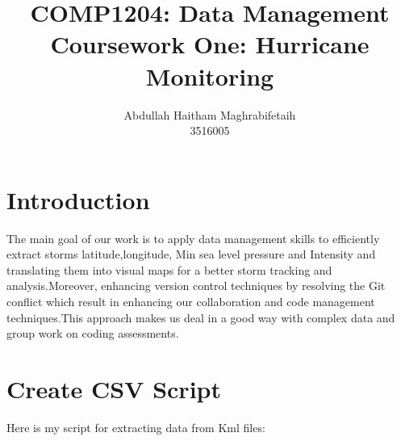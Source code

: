 \documentclass[12pt]{article}
\title{COMP1204: Data Management \\ Coursework One: Hurricane Monitoring }
\author{Abdullah Haitham Maghrabifetaih\\ 3516005}
\begin{document}
\maketitle

\newpage
\section{Introduction}

The main goal of our work  is to apply data management skills to efficiently extract storms latitude,longitude, Min sea level pressure and Intensity and translating them into visual maps for a better storm tracking and analysis.Moreover, enhancing version control techniques by resolving the Git conflict which result in enhancing our collaboration and code management techniques.This approach makes us deal in a good way with complex data and group work on coding assessments.

\section{Create CSV Script} 


Here is my script for extracting data from Kml files:
\end{document}
